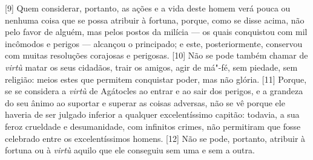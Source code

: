 {[}9{]} Quem considerar, portanto, as ações e a vida deste homem verá
pouca ou nenhuma coisa que se possa atribuir à fortuna, porque, como se
disse acima, não pelo favor de alguém, mas pelos postos da milícia --- os
quais conquistou com mil incômodos e perigos --- alcançou o principado; e
este, posteriormente, conservou com muitas resoluções corajosas e
perigosas. {[}10{]} Não se pode também chamar de \emph{virtù} matar os
seus cidadãos, trair os amigos, agir de má"-fé, sem piedade, sem
religião: meios estes que permitem conquistar poder, mas não
glória. {[}11{]} Porque, se se
considera a \emph{virtù} de Agátocles ao entrar e ao sair dos perigos, e
a grandeza do seu ânimo ao suportar e superar as coisas adversas, não se
vê porque ele haveria de ser julgado inferior a qualquer excelentíssimo
capitão: todavia, a sua feroz crueldade e desumanidade, com infinitos
crimes, não permitiram que fosse celebrado entre os excelentíssimos
homens. {[}12{]} Não se pode, portanto, atribuir à fortuna ou à
\emph{virtù} aquilo que ele conseguiu sem uma e sem a outra.

